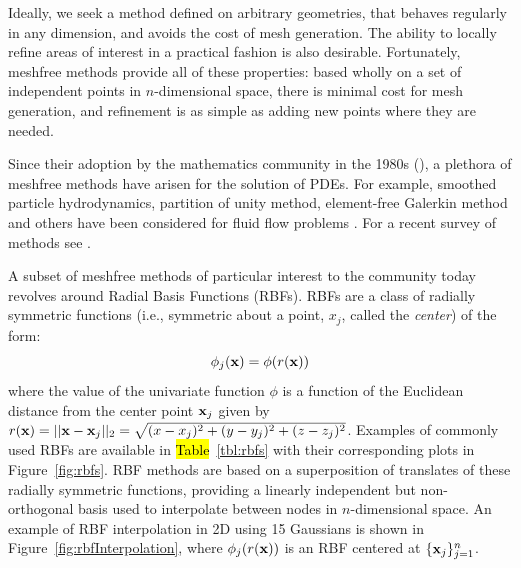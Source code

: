 Ideally, we seek a method defined on arbitrary geometries, that behaves regularly in any dimension, and avoids the cost of 
mesh generation. The ability to locally refine areas of interest in a practical fashion is also desirable. Fortunately, meshfree 
methods provide all of these properties: based wholly on a set of independent points in $n$-dimensional space, 
there is minimal cost for mesh generation, and refinement is as simple as adding new points where 
they are needed. 

Since their adoption by the mathematics community in the 1980s (\cite{Fasshauer2007}), a plethora of meshfree methods have 
arisen for the solution of PDEs. For example, smoothed particle hydrodynamics, partition of unity method, element-free Galerkin 
method and others have been considered for fluid flow problems \cite{Chandhini2007}. For a recent survey of methods see \cite{Li2007}.


A subset of meshfree methods of particular interest to the
community today revolves around Radial Basis Functions (RBFs).
RBFs are a class of radially symmetric functions (i.e.,
symmetric about a point, $x_j$, called the \emph{center}) of the
form: 
	\begin{equation} 
		\phi_j(\mathbf{x}) = \phi(r(\mathbf{x}))
	\end{equation} 
where the value of the univariate function $\phi$ is a
function of the Euclidean distance from the center point $\mathbf{x}_j$ given by
$r(\mathbf{x}) = ||\mathbf{x}-\mathbf{x}_j||_2 = \sqrt{(x-x_j)^2 + (y-y_j)^2 + (z-z_j)^2}$. Examples of
commonly used RBFs are available in \hl{Table}~\ref{tbl:rbfs}
with their corresponding plots in Figure~\ref{fig:rbfs}. RBF
methods are based on a superposition of translates of these
radially symmetric functions, providing a linearly independent
but non-orthogonal basis used to interpolate between nodes in
$n$-dimensional space. An example of RBF interpolation in 2D
using 15 Gaussians is shown in
Figure~\ref{fig:rbfInterpolation}, where $\phi_j(r(\mathbf{x}))$ is an
RBF centered at $\{\mathbf{x}_j\}_{j=1}^{n}$.

